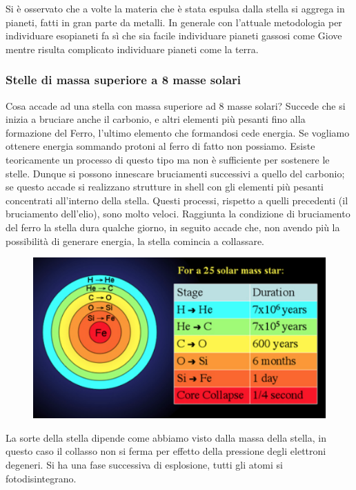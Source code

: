 Si è osservato che a volte la materia che è stata espulsa dalla stella si aggrega in pianeti, fatti in gran parte da metalli. In generale con l'attuale metodologia per individuare esopianeti fa sì che sia facile individuare pianeti gassosi come Giove mentre risulta complicato individuare pianeti come la terra.

\subsubsection{Stelle di massa superiore a 8 masse solari}

Cosa accade ad una stella con massa superiore ad 8 masse solari? Succede che si inizia a bruciare anche il carbonio, e altri elementi più pesanti fino alla formazione del Ferro, l'ultimo elemento che formandosi cede energia. Se vogliamo ottenere energia sommando protoni al ferro di fatto non possiamo. Esiste teoricamente un processo di questo tipo ma non è sufficiente per sostenere le stelle. Dunque si possono innescare bruciamenti successivi a quello del carbonio; se questo accade si realizzano strutture in shell con gli elementi più pesanti concentrati all'interno della stella. Questi processi, rispetto a quelli precedenti (il bruciamento dell'elio), sono molto veloci. Raggiunta la condizione di bruciamento del ferro la stella dura qualche giorno, in seguito accade che, non avendo più la possibilità di generare energia, la stella comincia a collassare.

\begin{figure}[H]
    \centering
    \includegraphics[width=12cm]{Mappa bruciamento elementi successivi.png}
    \label{fig:Mappa bruciamento elementi successivi.png}
\end{figure}

La sorte della stella dipende come abbiamo visto dalla massa della stella, in questo caso il collasso non si ferma per effetto della pressione degli elettroni degeneri. Si ha una fase successiva di esplosione, tutti gli atomi si fotodisintegrano.

